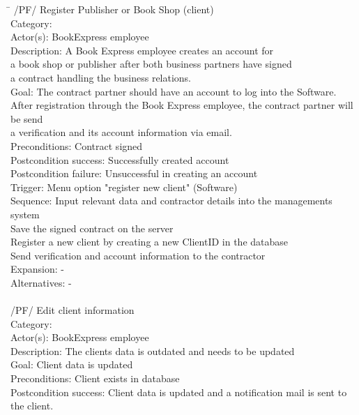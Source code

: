 \documentclass[11pt,a4paper,oneside,svgnames]{report}
\begin{document}
\begin{tabbing}
\hspace{3cm}\=\kill
	 /PF/ \> Register Publisher or Book Shop (client)\\ 
	 Category: \> \\
	 Actor(s): \> BookExpress employee\\ 
	 Description: \> A Book Express employee creates an account for\\ 
	 \> a book shop or publisher after both business partners have signed\\
	 \> a contract handling the business relations.\\
	 Goal: \> The contract partner should have an account to log into the Software.\\
	 \> After registration through the Book Express employee, the contract partner will be send\\
	 \> a verification and its account information via email.\\
	 Preconditions: \> Contract signed\\
	 Postcondition success: \> Successfully created account\\
	 Postcondition failure: \> Unsuccessful in creating an account\\
	 Trigger: \> Menu option "register new client" (Software)\\
	 Sequence: Input relevant data and contractor details into the managements system\\
	 \> Save the signed contract on the server\\
	 \> Register a new client by creating a new ClientID in the database\\
	 \> Send verification and account information to the contractor\\
	 Expansion: \> -\\
	 Alternatives: \> -\\
	 \\
	 /PF/ \> Edit client information\\ 
	 Category: \> \\
	 Actor(s): \> BookExpress employee\\ 
	 Description: \> The clients data is outdated and needs to be updated\\ 
	 Goal: \> Client data is updated\\
	 Preconditions: \> Client exists in database\\
	 Postcondition success: \> Client data is updated and a notification mail is sent to the client.\\

\end{tabbing}
\end{document}
